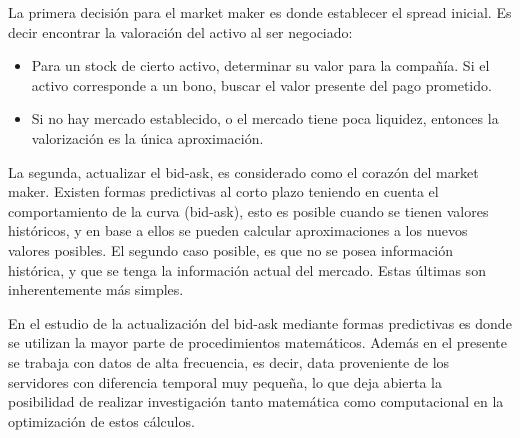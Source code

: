 La primera decisión para el market maker es donde establecer el spread inicial. Es decir encontrar la valoración del activo al ser negociado:
\begin{itemize}
        \item Para un stock de cierto activo, determinar su valor para la compañía. Si el activo corresponde a un bono, buscar el valor presente del pago prometido.
        \item Si no hay mercado establecido, o el mercado tiene poca liquidez, entonces la valorización es la única aproximación. \cite{seppi1997liquidity}
\end{itemize}

La segunda, actualizar el bid-ask, es considerado como el corazón del market maker. Existen formas predictivas al corto plazo teniendo en cuenta el comportamiento
de la curva (bid-ask), esto es posible cuando se tienen valores históricos, y en base a ellos se pueden calcular aproximaciones a los nuevos valores posibles.
El segundo caso posible, es que no se posea información histórica, y que se tenga la información actual del mercado. Estas últimas son inherentemente más simples.

En el estudio de la actualización del bid-ask mediante formas predictivas es donde se utilizan la mayor parte de procedimientos matemáticos. Además en el presente
se trabaja con datos de alta frecuencia, es decir, data proveniente de los servidores con diferencia temporal muy pequeña, lo que deja abierta la posibilidad
de realizar investigación tanto matemática como computacional en la optimización de estos cálculos.
